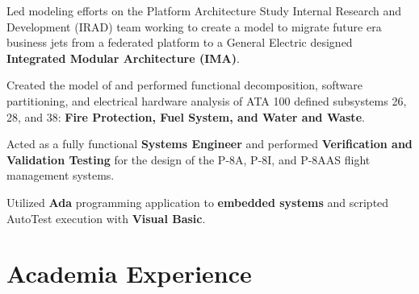 \documentclass[letterpaper]{deedy-resume} %
\begin{document}
\begin{minipage}[t]{0.66\textwidth}
\begin{tightitemize}
\item Led modeling efforts on the Platform Architecture Study Internal Research and Development (IRAD) team working to create a model to migrate future era business jets from a federated platform to a General Electric designed \textbf{Integrated Modular Architecture (IMA)}. 
\item Created the model of and performed functional decomposition, software partitioning, and electrical hardware analysis of ATA 100 defined subsystems 26, 28, and 38: \textbf{Fire Protection, Fuel System, and Water and Waste}.
\end{tightitemize}

\begin{tightitemize}
\item Acted as a fully functional \textbf{Systems Engineer} and performed \textbf{Verification and Validation Testing} for the design of the P-8A, P-8I, and P-8AAS flight management systems.
\item Utilized \textbf{Ada} programming application to \textbf{embedded systems} and scripted AutoTest execution with \textbf{Visual Basic}.
\end{tightitemize}



\sectionspace %


\section{Academia Experience}



\end{minipage}
\end{document}
